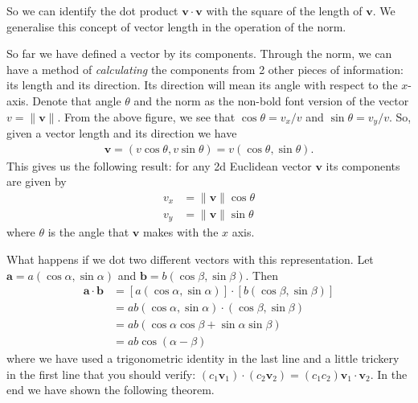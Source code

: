 \noindent So we can identify the dot product $\mathbf{v}\cdot\mathbf{v}$ with the square of the length of $\mathbf{v}$. We generalise this concept of vector length in the operation of the norm.


\noindent So far we have defined a vector by its components. Through the norm, we can have a method of \textit{calculating} the components from 2 other pieces of information: its length and its direction. Its direction will mean its angle with respect to the $x$-axis. Denote that angle $\theta$ and the norm as the non-bold font version of the vector $v=\lVert \mathbf{v} \rVert$. From the above figure, we see that $\cos\theta = v_x/v$ and $\sin\theta = v_y/v$. So, given a vector length and its direction we have
\begin{align*}
\mathbf{v} = (v\cos\theta, v\sin\theta) = v(\cos\theta,\sin\theta).
\end{align*}
This gives us the following result: for any 2d Euclidean vector $\mathbf{v}$ its components are given by
\begin{align*}
v_x &= \lVert \mathbf{v} \rVert \cos\theta \\
v_y &= \lVert \mathbf{v} \rVert \sin\theta
\end{align*}
where $\theta$ is the angle that $\mathbf{v}$ makes with the $x$ axis.

\noindent What happens if we dot two different vectors with this representation. Let $\mathbf{a}=a(\cos\alpha,\sin\alpha)$ and $\mathbf{b}=b(\cos\beta,\sin\beta)$. Then
\begin{align*}
\mathbf{a}\cdot\mathbf{b} &= [a(\cos\alpha,\sin\alpha)]\cdot [b(\cos\beta,\sin\beta)] \\
&= ab(\cos\alpha,\sin\alpha)\cdot (\cos\beta,\sin\beta) \\
&= ab(\cos\alpha\cos\beta + \sin\alpha\sin\beta) \\
&= ab \cos(\alpha-\beta)
\end{align*}
where we have used a trigonometric identity in the last line and a little trickery in the first line that you should verify: $(c_1\mathbf{v}_1)\cdot(c_2\mathbf{v}_2)=(c_1c_2)\mathbf{v}_1\cdot\mathbf{v}_2$. In the end we have shown the following theorem.

